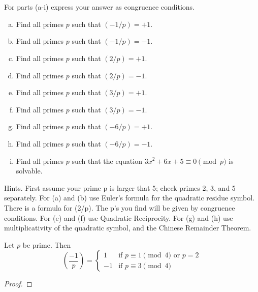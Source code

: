 \section{}

For parts (a-i) express your answer as congruence conditions.
\begin{enumerate}[(a)]
\item Find all primes $p$ such that $(-1/p) = +1$. 
\item Find all primes $p$ such that $(-1/p) = -1$. 
\item Find all primes $p$ such that $(2/p) = +1$.
\item Find all primes $p$ such that $(2/p) = -1$.
\item Find all primes $p$ such that $(3/p) = +1$.
\item Find all primes $p$ such that $(3/p) = -1$.
\item Find all primes $p$ such that $(-6/p) = +1$. 
\item Find all primes $p$ such that $(-6/p) = -1$. 
\item Find all primes $p$ such that the equation
$3x^2 + 6x + 5 \equiv 0 \pmod{p}$ is solvable.
\end{enumerate}

Hints.  First assume your prime p is larger that 5; check primes 2, 3, and 5 
separately.  For (a) and (b) use Euler's formula for the quadratic residue 
symbol. There is a formula for (2/p). The p's you find will be given by
congruence conditions. For (e) and (f) use Quadratic Reciprocity. For (g) and 
(h) use multiplicativity of the quadratic symbol, and the Chinese Remainder 
Theorem.


\begin{prop}
Let $p$ be prime. Then
\[
\left( \dfrac{-1}{p} \right)  = 
\begin{cases} 
	1  &\text{if } p \equiv 1 \pmod{4} \text{ or } p=2 \\
	-1 &\text{if } p \equiv 3 \pmod{4}
\end{cases} 
\]
\end{prop}

\begin{proof}

\end{proof}